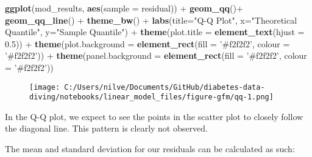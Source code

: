 \documentclass[
]{article}
\newenvironment{Shaded}{}{}
\newcommand{\DataTypeTok}[1]{\textcolor[rgb]{0.56,0.13,0.00}{#1}}
\newcommand{\FloatTok}[1]{\textcolor[rgb]{0.25,0.63,0.44}{#1}}
\newcommand{\KeywordTok}[1]{\textcolor[rgb]{0.00,0.44,0.13}{\textbf{#1}}}
\newcommand{\NormalTok}[1]{#1}
\newcommand{\OperatorTok}[1]{\textcolor[rgb]{0.40,0.40,0.40}{#1}}
\newcommand{\StringTok}[1]{\textcolor[rgb]{0.25,0.44,0.63}{#1}}
\begin{document}
\begin{Shaded}
\begin{Highlighting}[]
\KeywordTok{ggplot}\NormalTok{(mod_results, }\KeywordTok{aes}\NormalTok{(}\DataTypeTok{sample =}\NormalTok{ residual)) }\OperatorTok{+}\StringTok{ }
\StringTok{    }\KeywordTok{geom_qq}\NormalTok{()}\OperatorTok{+}
\StringTok{  }\KeywordTok{geom_qq_line}\NormalTok{() }\OperatorTok{+}
\StringTok{  }\KeywordTok{theme_bw}\NormalTok{() }\OperatorTok{+}
\StringTok{  }\KeywordTok{labs}\NormalTok{(}\DataTypeTok{title=}\StringTok{"Q-Q Plot"}\NormalTok{, }\DataTypeTok{x=}\StringTok{"Theoretical Quantile"}\NormalTok{, }\DataTypeTok{y=}\StringTok{"Sample Quantile"}\NormalTok{) }\OperatorTok{+}
\StringTok{  }\KeywordTok{theme}\NormalTok{(}\DataTypeTok{plot.title =} \KeywordTok{element_text}\NormalTok{(}\DataTypeTok{hjust =} \FloatTok{0.5}\NormalTok{)) }\OperatorTok{+}
\StringTok{  }\KeywordTok{theme}\NormalTok{(}\DataTypeTok{plot.background =} \KeywordTok{element_rect}\NormalTok{(}\DataTypeTok{fill =} \StringTok{'#f2f2f2'}\NormalTok{, }\DataTypeTok{colour =} \StringTok{'#f2f2f2'}\NormalTok{)) }\OperatorTok{+}
\StringTok{  }\KeywordTok{theme}\NormalTok{(}\DataTypeTok{panel.background =} \KeywordTok{element_rect}\NormalTok{(}\DataTypeTok{fill =} \StringTok{'#f2f2f2'}\NormalTok{, }\DataTypeTok{colour =} \StringTok{'#f2f2f2'}\NormalTok{))}
\end{Highlighting}
\end{Shaded}

\begin{figure}
\centering
\texttt{[image: C:/Users/nilve/Documents/GitHub/diabetes-data-diving/notebooks/linear\_model\_files/figure-gfm/qq-1.png]}
\caption{}
\end{figure}

In the Q-Q plot, we expect to see the points in the scatter plot to
closely follow the diagonal line. This pattern is clearly not observed.

The mean and standard deviation for our residuals can be calculated as
such:

\begin{Shaded}
\end{Shaded}
\end{document}
